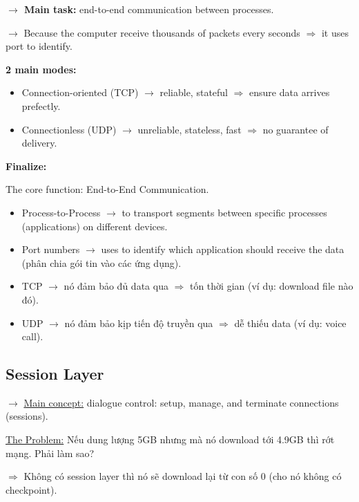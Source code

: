 \noindent
\textbf{$\rightarrow$ Main task:} end-to-end communication between processes.
\medskip

\noindent
$\rightarrow$ Because the computer receive thousands of packets every seconds $\Rightarrow$ it uses port to identify.
\medskip

\noindent
\textbf{2 main modes:}

\begin{itemize}
    \item Connection-oriented (TCP) $\rightarrow$ reliable, stateful $\Rightarrow$ ensure data arrives prefectly.
    \item Connectionless (UDP) $\rightarrow$ unreliable, stateless, fast $\Rightarrow$ no guarantee of delivery.
\end{itemize}
\medskip

\noindent
\textbf{Finalize:}
\medskip

\noindent
The core function: End-to-End Communication.

\begin{itemize}
    \item Process-to-Process $\rightarrow$ to transport segments between specific processes (applications) on different devices.
    \item Port numbers $\rightarrow$ uses to identify which application should receive the data (phân chia gói tin vào các ứng dụng).
\end{itemize}
\medskip

{
\begin{itemize}
    \item TCP $\rightarrow$ nó đảm bảo đủ data qua $\Rightarrow$ tốn thời gian (ví dụ: download file nào đó).
    \item UDP $\rightarrow$ nó đảm bảo kịp tiến độ truyền qua $\Rightarrow$ dễ thiếu data (ví dụ: voice call).
\end{itemize}
}

\subsection{Session Layer}

\noindent
$\rightarrow$ \underline{Main concept:} dialogue control: setup, manage, and terminate connections (sessions).
\medskip

\noindent
\underline{The Problem:} Nếu dung lượng 5GB nhưng mà nó download tới 4.9GB thì rớt mạng. Phải làm sao?

$\Rightarrow$ Không có session layer thì nó sẽ download lại từ con số 0 (cho nó không có checkpoint).
\medskip

